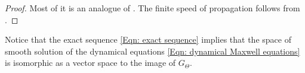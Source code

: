 \begin{proof}
	Most of it is an analogue of \cite[Thm. 30- Prop. 36]{Dappiaggi-Drago-Ferreira-19}.
	The finite speed of propagation follows from \cite{Higson-Roe-00,Mcintosh-Morris-13}.
\end{proof}
\begin{remark}
	Notice that the exact sequence \eqref{Eqn: exact sequence} implies that the space of smooth solution of the dynamical equations \eqref{Eqn: dynamical Maxwell equations} is isomorphic as a vector space to the image of $G_\Theta$.
\end{remark}


%
%

